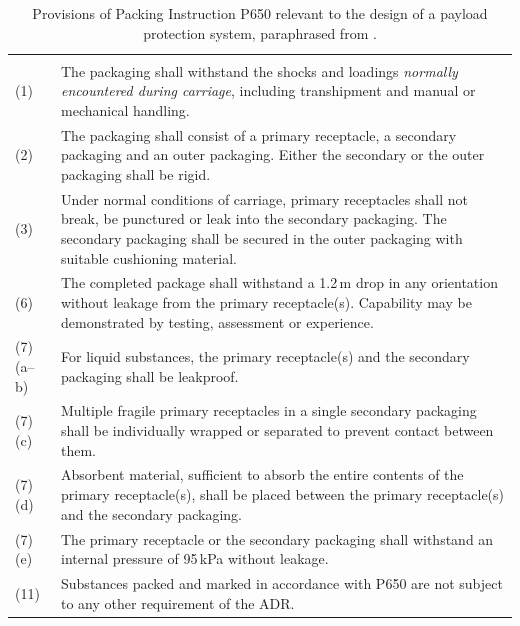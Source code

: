 {\longtablesetup
\begin{longtable}{G{0.12} L{0.88}}
\caption[Provisions of Packing Instruction P650 relevant to the thesis]{Provisions of Packing Instruction P650 relevant to the design of a payload protection system, paraphrased from \cite{ADR_2025}.}
\label{tab:p650}\\
\headrow{} &  \\
\endfirsthead
\headrow{} &  \\
\endhead
{}
\endfoot
\lastrule
\endlastfoot

(1)
& The packaging shall withstand the shocks and loadings \textit{normally encountered during carriage}, including transhipment and manual or mechanical handling. \\
(2)
& The packaging shall consist of a primary receptacle, a secondary packaging and an outer packaging. Either the secondary or the outer packaging shall be rigid. \\
(3)
& Under normal conditions of carriage, primary receptacles shall not break, be punctured or leak into the secondary packaging. The secondary packaging shall be secured in the outer packaging with suitable cushioning material. \\
(6)
& The completed package shall withstand a 1.2\,m drop in any orientation without leakage from the primary receptacle(s). Capability may be demonstrated by testing, assessment or experience. \\
(7)(a--b)
& For liquid substances, the primary receptacle(s) and the secondary packaging shall be leakproof. \\
(7)(c)
& Multiple fragile primary receptacles in a single secondary packaging shall be individually wrapped or separated to prevent contact between them. \\
(7)(d)
& Absorbent material, sufficient to absorb the entire contents of the primary receptacle(s), shall be placed between the primary receptacle(s) and the secondary packaging. \\
(7)(e)
& The primary receptacle or the secondary packaging shall withstand an internal pressure of 95\,kPa without leakage. \\
(11)
& Substances packed and marked in accordance with P650 are not subject to any other requirement of the ADR. \\
\end{longtable}
}
